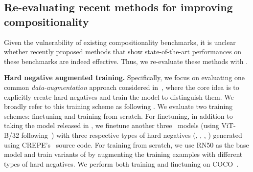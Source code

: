


\subsection{Re-evaluating recent methods for improving compositionality}
\label{sec:exp-reeval}
Given the vulnerability of existing compositionality benchmarks, it is unclear whether recently proposed methods that show state-of-the-art performances on these benchmarks are indeed effective. Thus, we re-evaluate these methods with \method.

\textbf{Hard negative augmented training.} 
Specifically, we focus on evaluating one common \emph{data-augmentation} approach considered in~\cite{yuksekgonul2023when,doveh2023teaching}, where the core idea is to explicitly create hard negatives and train the model to distinguish them. We broadly refer to this training scheme as \negclip following \cite{yuksekgonul2023when}.
We evaluate two \negclip training schemes: finetuning and training from scratch.
For finetuning, in addition to taking the model released in \cite{yuksekgonul2023when}, we finetune another three \negclip\ models (using ViT-B/32 following~\cite{yuksekgonul2023when}) with three respective types of hard negatives (\ie, \replace, \swap, \negate) generated using CREPE's~\cite{ma2022crepe} source code.
For training from scratch, we use RN50 as the base model and train variants of \negclip by augmenting the training examples with different types of hard negatives.
We perform both training and finetuning on COCO~\cite{lin2014microsoft}.

